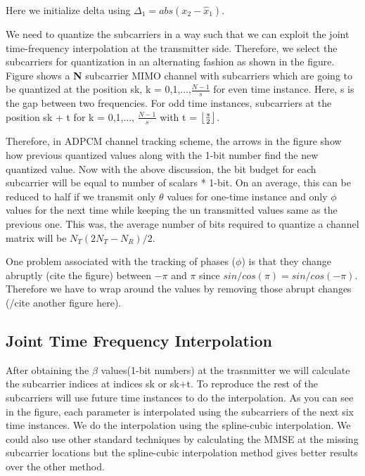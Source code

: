 \documentclass[conference]{IEEEtran}
\DeclarePairedDelimiter\floor{\lfloor}{\rfloor}
\begin{document}
Here we initialize delta using $\Delta_1 = abs(x_{2}-\hat{x}_1)$.

We need to quantize the subcarriers in a way such that we can exploit the joint time-frequency interpolation at the transmitter side. Therefore, we select the subcarriers for quantization in an alternating fashion as shown in the figure. Figure shows a \textbf{N} subcarrier MIMO channel with subcarriers which are going to be quantized at the position sk, k = 0,1,...,$\frac{N-1}{s}$ for even time instance. Here, s is the gap between two frequencies. For odd time instances, subcarriers at the position sk + t for k = 0,1,..., $\frac{N-1}{s}$ with t = $\floor*{\frac{s}{2}}$. 

Therefore, in ADPCM channel tracking scheme, the arrows in the figure show how previous quantized values along with the 1-bit number find the new quantized value. Now with the above discussion, the bit budget for each subcarrier will be equal to number of scalars * 1-bit. On an average, this can be reduced to half if we transmit only $\theta$ values for one-time instance and only $\phi$ values for the next time while keeping the un transmitted values same as the previous one. This was, the average number of bits required to quantize a channel matrix will be $N_{T}(2N_{T} - N_{R})/2$. 

One problem associated with the tracking of phases ($\phi$) is that they change abruptly (cite the figure) between $-\pi$ and $\pi$ since $sin/cos(\pi) = sin/cos(-\pi)$. Therefore we have to wrap around the values by removing those abrupt changes (/cite another figure here). 


\subsection{Joint Time Frequency Interpolation} 
\label{interp} 

After obtaining the $\beta$ values(1-bit numbers) at the trasnmitter we will calculate the subcarrier indices at indices sk or sk+t. To reproduce the rest of the subcarriers will use future time instances to do the interpolation. As you can see in the figure, each parameter is interpolated using the subcarriers of the next six time instances. We do the interpolation using the spline-cubic interpolation. We could also use other standard techniques by calculating the MMSE at the missing subcarrier locations but the spline-cubic interpolation method gives better results over the other method. 
\end{document}

